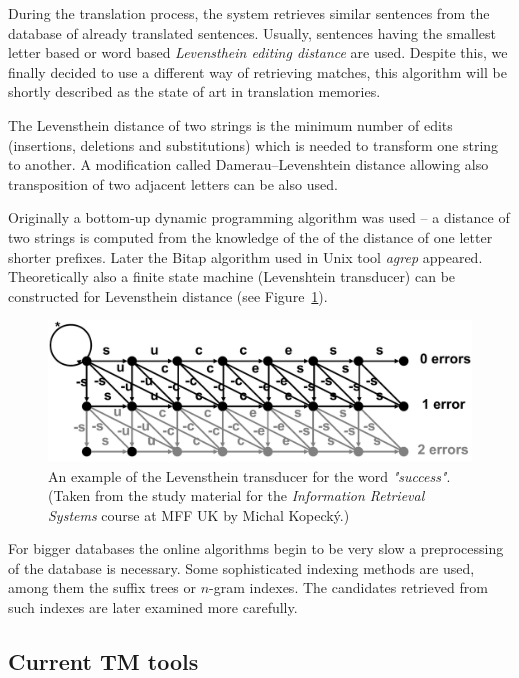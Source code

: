 During the translation process, the system retrieves similar sentences from the database of already translated sentences. Usually, sentences having the smallest letter based or word based \emph{Levensthein editing distance} are used. Despite this, we finally decided to use a different way of retrieving matches, this algorithm will be shortly described as the state of art in translation memories.

The Levensthein distance of two strings is the minimum number of edits (insertions, deletions and substitutions) which is needed to transform one string to another. A modification called Damerau–Levenshtein distance allowing also transposition of two adjacent letters can be also used.

Originally a bottom-up dynamic programming algorithm was used -- a distance of two strings is computed from the knowledge of the of the distance of one letter shorter prefixes. Later the Bitap algorithm used in Unix tool \emph{agrep} appeared. Theoretically also a finite state machine (Levenshtein transducer) can be constructed for Levensthein distance (see Figure~\ref{fig:levensthein_transducer}).

\begin{figure}
\begin{center}
\includegraphics[scale=0.65]{./figures/levensthein.pdf}
\end{center}

\caption{An example of the Levensthein transducer for the word \emph{"success"}. (Taken from the study material for the \emph{Information Retrieval Systems} course at MFF UK by Michal Kopecký.)}
\label{fig:levensthein_transducer}
\end{figure}

For bigger databases the online algorithms begin to be very slow a preprocessing of the database is necessary. Some sophisticated indexing methods are used, among them the suffix trees or $n$-gram indexes. The candidates retrieved from such indexes are later examined more carefully.

\subsection{Current TM tools}

